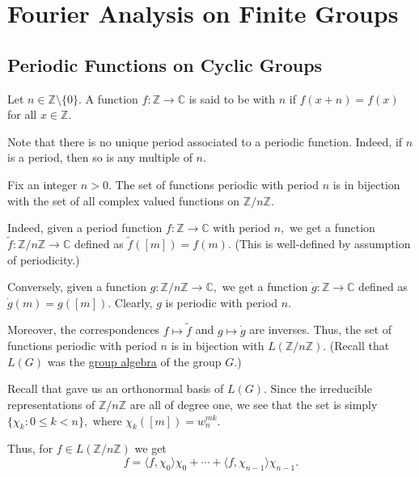 \section{Fourier Analysis on Finite Groups}
\subsection{Periodic Functions on Cyclic Groups}

\begin{defn}
    Let $n \in \mathbb{Z} \setminus \{0\}.$ A function $f : \mathbb{Z} \to \mathbb{C}$ is said to be  with  $n$ if $f(x + n) = f(x)$ for all $x \in \mathbb{Z}.$
\end{defn}

Note that there is no unique period associated to a periodic function. Indeed, if $n$ is a period, then so is any multiple of $n.$

\begin{rem}
    Fix an integer $n > 0.$ The set of functions periodic with period $n$ is in bijection with the set of all complex valued functions on $\mathbb{Z}/n\mathbb{Z}.$
    
    Indeed, given a period function $f : \mathbb{Z} \to \mathbb{C}$ with period $n,$ we get a function $\tilde{f} : \mathbb{Z}/n\mathbb{Z} \to \mathbb{C}$ defined as $\tilde{f}([m]) = f(m).$ (This is well-defined by assumption of periodicity.)
    
    Conversely, given a function $g : \mathbb{Z}/n\mathbb{Z} \to \mathbb{C},$ we get a function $\dot{g} : \mathbb{Z} \to \mathbb{C}$ defined as $\dot{g}(m) = g([m]).$ Clearly, $g$ is periodic with period $n.$
    
    Moreover, the correspondences $f \mapsto \tilde{f}$ and $g \mapsto \dot{g}$ are inverses. Thus, the set of functions periodic with period $n$ is in bijection with $L(\mathbb{Z}/n\mathbb{Z}).$ (Recall that $L(G)$ was the \hyperref[defn:groupalg]{group algebra} of the group $G.$)
\end{rem}

\begin{rem}
    Recall that  gave us an orthonormal basis of $L(G).$ Since the irreducible representations of $\mathbb{Z}/n\mathbb{Z}$ are all of degree one, we see that the set is simply $\{\chi_k : 0 \le k < n\},$ where $\chi_k([m]) = w_n^{mk}.$
    
    Thus, for $f \in L(\mathbb{Z}/n\mathbb{Z})$ we get 
    \begin{equation*}
        f = \langle f, \chi_0\rangle \chi_0 + \cdots + \langle f, \chi_{n - 1}\rangle \chi_{n - 1}.
    \end{equation*}
\end{rem}

